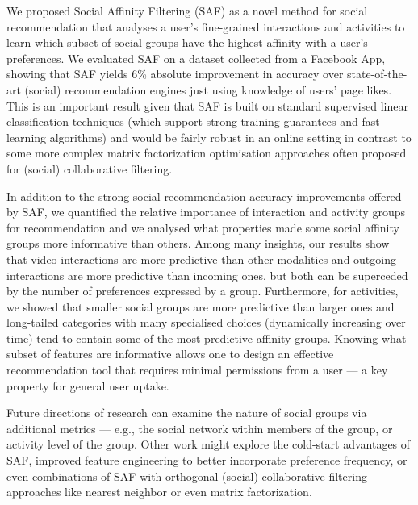 
We proposed Social Affinity Filtering (SAF) as a novel method for social
recommendation that analyses a user's fine-grained interactions and
activities to learn which subset of social groups have the highest affinity with
a user's preferences.  We evaluated SAF on a dataset collected from a
Facebook App, showing that SAF yields 6\% absolute improvement in
accuracy over state-of-the-art (social) recommendation engines just
using knowledge of users' page likes.  This is an important result
given that SAF is built on standard supervised linear classification
techniques (which support strong training guarantees and fast learning
algorithms) and would be fairly robust in an online setting 
in contrast to some more complex matrix factorization optimisation approaches
often proposed for (social) collaborative filtering.

In addition to the strong social recommendation accuracy improvements
offered by SAF, we quantified the relative importance of interaction
and activity groups for recommendation and we analysed what properties
made some social affinity groups more informative than others.  Among
many insights, our results show that video interactions are more
predictive than other modalities and outgoing interactions are more
predictive than incoming ones, but both can be superceded by the
number of preferences expressed by a group.  Furthermore, for
activities, we showed that smaller social groups are more predictive
than larger ones and long-tailed categories with many specialised
choices (dynamically increasing over time) tend to contain some of
the most predictive affinity groups.  Knowing what subset of features
are informative allows one to design an effective recommendation tool
that requires minimal permissions from a user --- a key property for
general user uptake.

Future directions of research can 
examine the nature of social groups via additional metrics --- e.g.,
the social network within members of the group, or activity level of
the group.  Other work might explore the cold-start advantages of SAF, 
improved feature engineering to better incorporate
preference frequency, or even combinations of SAF with
orthogonal (social) collaborative filtering approaches like nearest
neighbor or even matrix factorization.


